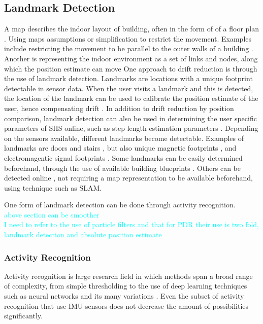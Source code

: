 \subsection{Landmark Detection}
A map describes the indoor layout of building, often in the form of of a floor plan \cite{Gu2019}. Using maps assumptions or simplification to restrict the movement. Examples include restricting the movement to be parallel to the outer walls of a building \cite{Abdulrahim2011}. Another is representing the indoor environment as a set of links and nodes, along which the position estimate can move \cite{Davidson2017,Jackermeier2018} 
One approach to drift reduction is through the use of landmark detection. Landmarks are locations with a unique footprint detectable in sensor data. When the user visits a landmark and this is detected, the location of the landmark can be used to calibrate the position estimate of the user, hence compensating drift \cite{Diaz2017}. In addition to drift reduction by position comparison, landmark detection can also be used in determining the user specific parameters of \ac{SHS} online, such as step length estimation parameters \cite{Gu2019,Shang2015}.  Depending on the sensors available, different landmarks become detectable. Examples of landmarks are doors and stairs \cite{Diaz2017,Gu2019,Torok2014}, but also unique magnetic footprints \cite{MunozDiaz2019}, and electromagentic signal footprints \cite{Gu2019}. Some landmarks can be easily determined beforehand, through the use of available building blueprints \cite{Gu2019}. Others can be detected online \cite{Hardegger2012, Hardegger2016}, not requiring a map representation to be available beforehand, using technique such as \ac{SLAM}. 

One form of landmark detection can be done through activity recognition. \\
\textcolor{cyan}{above section can be smoother} \\ \newline
\textcolor{cyan}{ I need to refer to the use of particle filters and that for PDR their use is two fold, landmark detection and absolute position estimate}

\subsubsection{Activity Recognition}
Activity recognition is large research field in which methods span a broad range of complexity, from simple thresholding to the use of deep learning techniques such as neural networks and its many variations \cite{Lima2019}. Even the subset of activity recognition that use IMU sensors does not decrease the amount of possibilities significantly.

